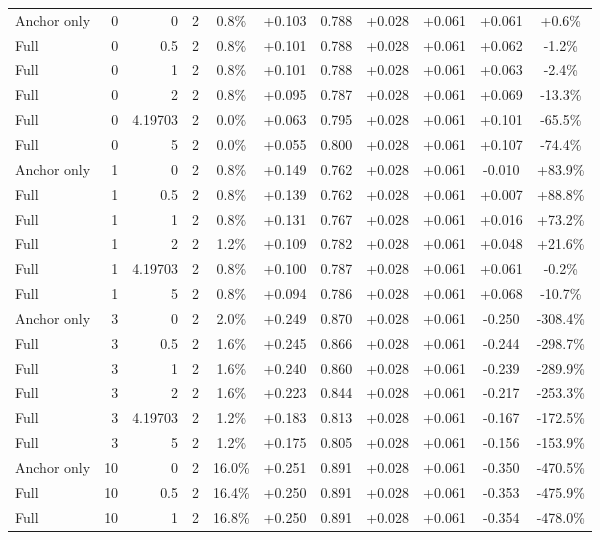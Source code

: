\begin{table}[htbp]
\begin{tabular}{lrrrccccccc}
Anchor only & 0 & 0 & 2 & 0.8\% & +0.103 & 0.788 & +0.028 & +0.061 & +0.061 & +0.6\% \\
Full & 0 & 0.5 & 2 & 0.8\% & +0.101 & 0.788 & +0.028 & +0.061 & +0.062 & -1.2\% \\
Full & 0 & 1 & 2 & 0.8\% & +0.101 & 0.788 & +0.028 & +0.061 & +0.063 & -2.4\% \\
Full & 0 & 2 & 2 & 0.8\% & +0.095 & 0.787 & +0.028 & +0.061 & +0.069 & -13.3\% \\
Full & 0 & 4.19703 & 2 & 0.0\% & +0.063 & 0.795 & +0.028 & +0.061 & +0.101 & -65.5\% \\
Full & 0 & 5 & 2 & 0.0\% & +0.055 & 0.800 & +0.028 & +0.061 & +0.107 & -74.4\% \\
Anchor only & 1 & 0 & 2 & 0.8\% & +0.149 & 0.762 & +0.028 & +0.061 & -0.010 & +83.9\% \\
Full & 1 & 0.5 & 2 & 0.8\% & +0.139 & 0.762 & +0.028 & +0.061 & +0.007 & +88.8\% \\
Full & 1 & 1 & 2 & 0.8\% & +0.131 & 0.767 & +0.028 & +0.061 & +0.016 & +73.2\% \\
Full & 1 & 2 & 2 & 1.2\% & +0.109 & 0.782 & +0.028 & +0.061 & +0.048 & +21.6\% \\
Full & 1 & 4.19703 & 2 & 0.8\% & +0.100 & 0.787 & +0.028 & +0.061 & +0.061 & -0.2\% \\
Full & 1 & 5 & 2 & 0.8\% & +0.094 & 0.786 & +0.028 & +0.061 & +0.068 & -10.7\% \\
Anchor only & 3 & 0 & 2 & 2.0\% & +0.249 & 0.870 & +0.028 & +0.061 & -0.250 & -308.4\% \\
Full & 3 & 0.5 & 2 & 1.6\% & +0.245 & 0.866 & +0.028 & +0.061 & -0.244 & -298.7\% \\
Full & 3 & 1 & 2 & 1.6\% & +0.240 & 0.860 & +0.028 & +0.061 & -0.239 & -289.9\% \\
Full & 3 & 2 & 2 & 1.6\% & +0.223 & 0.844 & +0.028 & +0.061 & -0.217 & -253.3\% \\
Full & 3 & 4.19703 & 2 & 1.2\% & +0.183 & 0.813 & +0.028 & +0.061 & -0.167 & -172.5\% \\
Full & 3 & 5 & 2 & 1.2\% & +0.175 & 0.805 & +0.028 & +0.061 & -0.156 & -153.9\% \\
Anchor only & 10 & 0 & 2 & 16.0\% & +0.251 & 0.891 & +0.028 & +0.061 & -0.350 & -470.5\% \\
Full & 10 & 0.5 & 2 & 16.4\% & +0.250 & 0.891 & +0.028 & +0.061 & -0.353 & -475.9\% \\
Full & 10 & 1 & 2 & 16.8\% & +0.250 & 0.891 & +0.028 & +0.061 & -0.354 & -478.0\% \\

\end{tabular}
\end{table}
